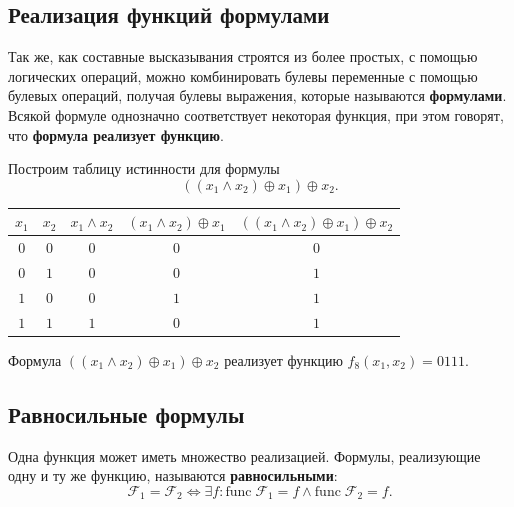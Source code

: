 \subsection{Реализация функций формулами}

Так же, как составные высказывания строятся из более простых, с помощью логических операций, можно комбинировать булевы переменные с помощью булевых операций, получая булевы выражения, которые называются \textbf{формулами}. Всякой формуле однозначно соответствует некоторая функция, при этом говорят, что \textbf{формула реализует функцию}.

\begin{example*}
    Построим таблицу истинности для формулы
    \[
        ((x_1 \land x_2) \oplus x_1) \oplus x_2.
    \]

    {
    \renewcommand*{\arraystretch}{1.5}
    \begin{longtable}{|c|c|c|c|c|}
        \hline
        \(x_1\) & \(x_2\) & \(x_1 \land x_2\) & \((x_1 \land x_2) \oplus x_1\) & \(((x_1 \land x_2) \oplus x_1) \oplus x_2\) \\
        \hline
        \(0\)   & \(0\)   & \(0\)             & \(0\)                          & \(0\)                                       \\
        \hline
        \(0\)   & \(1\)   & \(0\)             & \(0\)                          & \(1\)                                       \\
        \hline
        \(1\)   & \(0\)   & \(0\)             & \(1\)                          & \(1\)                                       \\
        \hline
        \(1\)   & \(1\)   & \(1\)             & \(0\)                          & \(1\)                                       \\
        \hline
    \end{longtable}
    }

    Формула \(((x_1 \land x_2) \oplus x_1) \oplus x_2\) реализует функцию \(f_8(x_1, x_2) = 0111\).
\end{example*}

\subsection{Равносильные формулы}

Одна функция может иметь множество реализацией. Формулы, реализующие одну и ту же функцию, называются \textbf{равносильными}:
\[
    \mathcal{F}_1 = \mathcal{F}_2
    \iff
    \exists f: \text{func} \; \mathcal{F}_1 = f \land \text{func} \; \mathcal{F}_2 = f.
\]

